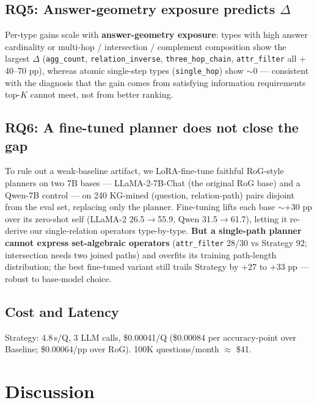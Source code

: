 \documentclass[10pt,a4paper,twocolumn]{article}
\newcommand{\qtype}[1]{\texttt{\small #1}}
\begin{document}
\subsection{RQ5: Answer-geometry exposure predicts \texorpdfstring{$\Delta$}{Delta}}
\label{sec:rq5}
Per-type gains scale with \textbf{answer-geometry exposure}: types with high answer cardinality or multi-hop / intersection / complement composition show the largest $\Delta$ (\qtype{agg\_count}, \qtype{relation\_inverse}, \qtype{three\_hop\_chain}, \qtype{attr\_filter} all $+$40--70 pp), whereas atomic single-step types (\qtype{single\_hop}) show $\sim$0 --- consistent with the diagnosis that the gain comes from satisfying information requirements top-$K$ cannot meet, not from better ranking.

\subsection{RQ6: A fine-tuned planner does not close the gap}
\label{sec:rq6}
To rule out a weak-baseline artifact, we LoRA-fine-tune faithful RoG-style planners on two 7B bases --- LLaMA-2-7B-Chat (the original RoG base) and a Qwen-7B control --- on 240 KG-mined (question, relation-path) pairs disjoint from the eval set, replacing only the planner. Fine-tuning lifts each base ${\sim}{+}30$ pp over its zero-shot self (LLaMA-2 26.5$\to$55.9, Qwen 31.5$\to$61.7), letting it re-derive our single-relation operators type-by-type. \textbf{But a single-path planner cannot express set-algebraic operators} (\qtype{attr\_filter} 28/30 vs Strategy 92; intersection needs two joined paths) and overfits its training path-length distribution; the best fine-tuned variant still trails Strategy by $+27$ to $+33$ pp --- robust to base-model choice.

\subsection{Cost and Latency}
Strategy: 4.8\,s/Q, 3 LLM calls, \$0.00041/Q (\$0.00084 per accuracy-point over Baseline; \$0.00064/pp over RoG). 100K questions/month $\approx$ \$41.

\section{Discussion}
\label{sec:discussion}
\end{document}
